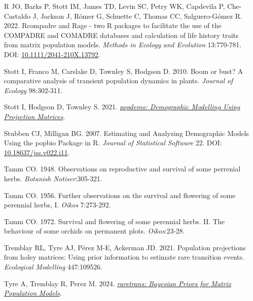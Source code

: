 \documentclass[
  12pt,
  letterpaper,
]{book}
\newlength{\cslhangindent}
\newenvironment{CSLReferences}[2] %
 {\begin{list}{}{%
  \setlength{\itemindent}{0pt}
  \setlength{\leftmargin}{0pt}
  \setlength{\parsep}{0pt}
  \ifodd #1
   \setlength{\leftmargin}{\cslhangindent}
   \setlength{\itemindent}{-1\cslhangindent}
  \fi
  \setlength{\itemsep}{#2\baselineskip}}}
 {\end{list}}
\begin{document}
\begin{CSLReferences}{1}{0}
R JO, Barks P, Stott IM, James TD, Levin SC, Petry WK, Capdevila P,
Che-Castaldo J, Jackson J, Römer G, Schuette C, Thomas CC,
Salguero-Gómez R. 2022. Rcompadre and Rage - two {R} packages to
facilitate the use of the {COMPADRE} and {COMADRE} databases and
calculation of life history traits from matrix population models.
\emph{Methods in Ecology and Evolution} 13:770-781. DOI:
\href{https://doi.org/10.1111/2041-210X.13792}{10.1111/2041-210X.13792}.

Stott I, Franco M, Carslake D, Townley S, Hodgson D. 2010. Boom or bust?
A comparative analysis of transient population dynamics in plants.
\emph{Journal of Ecology} 98:302-311.

Stott I, Hodgson D, Townley S. 2021.
\emph{\href{https://CRAN.R-project.org/package=popdemo}{popdemo:
Demographic Modelling Using Projection Matrices}}.

Stubben CJ, Milligan BG. 2007. Estimating and Analyzing Demographic
Models Using the popbio Package in R. \emph{Journal of Statistical
Software} 22. DOI:
\href{https://doi.org/10.18637/jss.v022.i11}{10.18637/jss.v022.i11}.

Tamm CO. 1948. Observations on reproductive and survival of some
perrenial herbs. \emph{Botanish Notiser}:305-321.

Tamm CO. 1956. Further observations on the survival and flowering of
some perennial herbs, I. \emph{Oikos} 7:273-292.

Tamm CO. 1972. Survival and flowering of some perennial herbs. II. The
behaviour of some orchids on permanent plots. \emph{Oikos}:23-28.

Tremblay RL, Tyre AJ, Pérez M-E, Ackerman JD. 2021. Population
projections from holey matrices: Using prior information to estimate
rare transition events. \emph{Ecological Modelling} 447:109526.

Tyre A, Tremblay R, Perez M. 2024.
\emph{\href{https://github.com/atyre2/raretrans}{raretrans: Bayesian
Priors for Matrix Population Models}}.

\end{CSLReferences}


\backmatter
\end{document}
